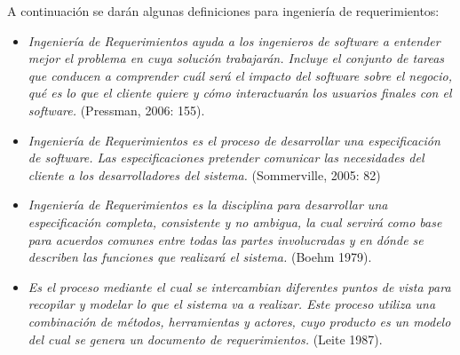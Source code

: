 \documentclass[11pt,oneside]{book}
\begin{document}
A continuación se darán algunas definiciones para ingeniería de requerimientos:
\begin{itemize}
\item \textit{Ingeniería de Requerimientos ayuda a los ingenieros de software a entender mejor el problema en cuya solución trabajarán. Incluye el conjunto de tareas que conducen a comprender cuál será el impacto del software sobre el negocio, qué es lo que el cliente quiere y cómo interactuarán los usuarios finales con el software.} (Pressman, 2006: 155).

\item \textit{Ingeniería de Requerimientos es el proceso de desarrollar una especificación de software. Las especificaciones pretender comunicar las necesidades del cliente a los desarrolladores del sistema.} (Sommerville, 2005: 82) 

\item \textit{Ingeniería de Requerimientos es la disciplina para desarrollar una especificación completa, consistente y no ambigua, la cual servirá como base para acuerdos comunes entre todas las partes involucradas y en dónde se describen las funciones que realizará el sistema.} (Boehm 1979).

\item \textit{Es el proceso mediante el cual se intercambian diferentes puntos de vista para recopilar y modelar lo que el sistema va a realizar. Este proceso utiliza una combinación de métodos, herramientas y actores, cuyo producto es un modelo del cual se genera un documento de requerimientos.} (Leite 1987).
\end{itemize}
\end{document}
